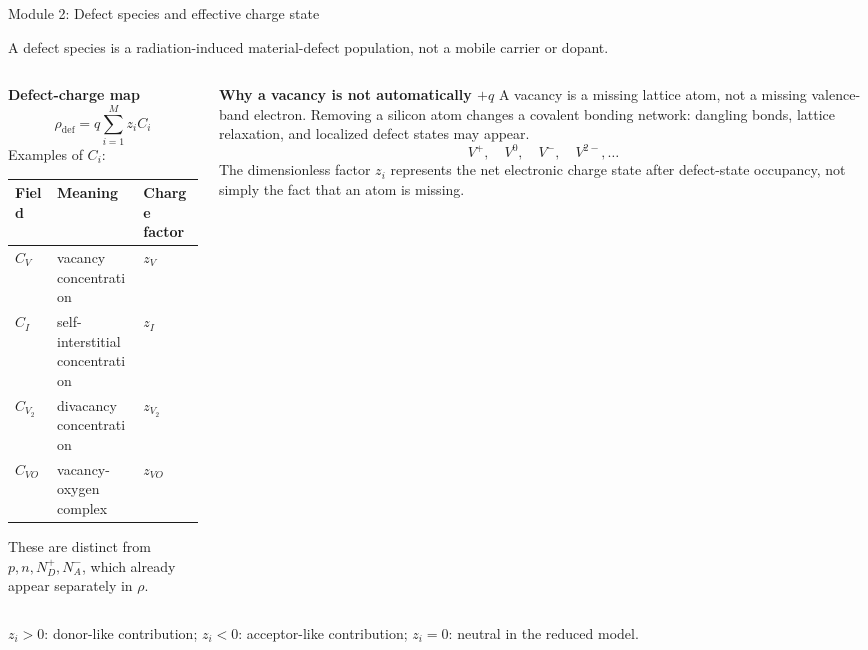 \documentclass[aspectratio=169,9pt]{beamer}
\begin{document}
\begin{frame}{Module 2: Defect species and effective charge state}
\footnotesize
\vspace{-3mm}
\begin{bluebox}
\centering
A defect species is a radiation-induced material-defect population, not a mobile carrier or dopant.
\end{bluebox}

\vspace{1mm}
\begin{columns}[T,totalwidth=\textwidth]
\begin{column}{0.52\textwidth}
\textbf{Defect-charge map}
\begin{equation*}
\boxed{\rho_{\mathrm{def}} = q\sum_{i=1}^{M} z_i C_i}
\end{equation*}
\small
Examples of \(C_i\):
\begin{center}
\scriptsize
\begin{tabular}{lll}
\toprule
Field & Meaning & Charge factor \\
\midrule
\(C_V\) & vacancy concentration & \(z_V\) \\
\(C_I\) & self-interstitial concentration & \(z_I\) \\
\(C_{V_2}\) & divacancy concentration & \(z_{V_2}\) \\
\(C_{VO}\) & vacancy-oxygen complex & \(z_{VO}\) \\
\bottomrule
\end{tabular}
\end{center}
\small
These are distinct from \(p,n,N_D^+,N_A^-\), which already appear separately in \(\rho\).
\end{column}
\begin{column}{0.46\textwidth}
\textbf{Why a vacancy is not automatically \(+q\)}
\small
A vacancy is a missing lattice atom, not a missing valence-band electron.  Removing a silicon atom changes a covalent bonding network: dangling bonds, lattice relaxation, and localized defect states may appear.
\begin{equation*}
\boxed{V^+,\quad V^0,\quad V^-,\quad V^{2-},\ldots}
\end{equation*}
\small
The dimensionless factor \(z_i\) represents the net electronic charge state after defect-state occupancy, not simply the fact that an atom is missing.
\end{column}
\end{columns}

\vspace{1mm}
\begin{purplebox}
\centering\scriptsize
\(z_i>0\): donor-like contribution; \(z_i<0\): acceptor-like contribution; \(z_i=0\): neutral in the reduced model.
\end{purplebox}
\end{frame}
\end{document}
